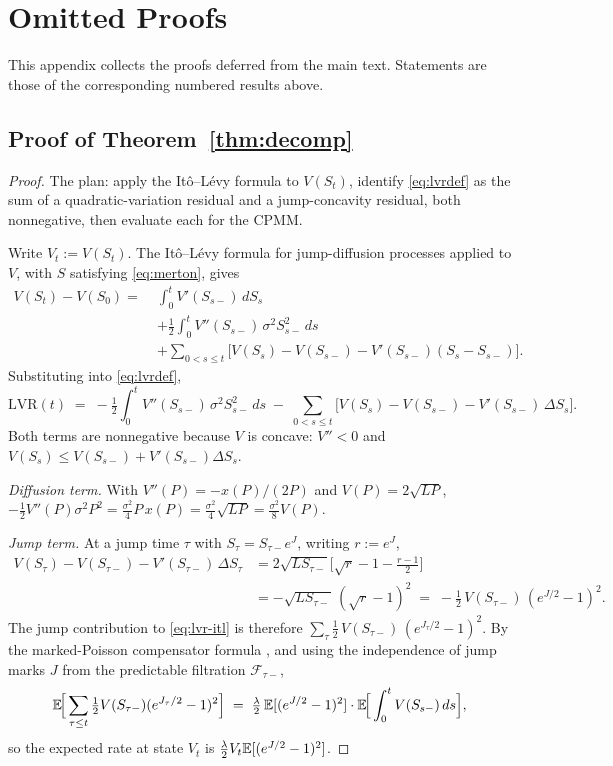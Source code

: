 \section{Omitted Proofs}\label{app:proofs}

This appendix collects the proofs deferred from the main text. Statements are
those of the corresponding numbered results above.

\subsection{Proof of Theorem~\ref{thm:decomp}}\label{app:decomp}

\begin{proof}
The plan: apply the It\^o--L\'evy formula to $V(S_t)$, identify \eqref{eq:lvrdef} as the sum of a quadratic-variation residual and a jump-concavity residual, both nonnegative, then evaluate each for the CPMM.

Write $V_t := V(S_t)$. The It\^o--L\'evy formula for jump-diffusion processes \cite[Prop.~8.14]{cont2003financial} applied to $V$, with $S$ satisfying \eqref{eq:merton}, gives
\begin{align*}
V(S_t) - V(S_0) =\;& \int_0^t V'(S_{s-})\,dS_s \\
&+ \tfrac{1}{2}\int_0^t V''(S_{s-})\,\sigma^2 S_{s-}^2 \,ds \\
&+ \sum_{0 < s \leq t} \!\Big[V(S_s) - V(S_{s-}) - V'(S_{s-})(S_s - S_{s-})\Big].
\end{align*}
Substituting into \eqref{eq:lvrdef},
\begin{equation}\label{eq:lvr-itl}
\mathrm{LVR}(t) \;=\; -\tfrac{1}{2}\int_0^t V''(S_{s-})\,\sigma^2 S_{s-}^2 \, ds \;-\; \sum_{0 < s \leq t}\!\Big[V(S_s) - V(S_{s-}) - V'(S_{s-})\,\Delta S_s\Big].
\end{equation}
Both terms are nonnegative because $V$ is concave: $V''<0$ and $V(S_s) \leq V(S_{s-}) + V'(S_{s-})\Delta S_s$.

\emph{Diffusion term.} With $V''(P) = -x(P)/(2P)$ and $V(P) = 2\sqrt{LP}$, $-\tfrac{1}{2} V''(P) \sigma^2 P^2 = \tfrac{\sigma^2}{4} P\,x(P) = \tfrac{\sigma^2}{4} \sqrt{L P} = \tfrac{\sigma^2}{8} V(P)$.

\emph{Jump term.} At a jump time $\tau$ with $S_\tau = S_{\tau-} e^{J}$, writing $r := e^J$,
\begin{align*}
V(S_\tau) - V(S_{\tau-}) - V'(S_{\tau-})\,\Delta S_\tau
&= 2\sqrt{L S_{\tau-}}\Big[\sqrt{r} - 1 - \tfrac{r-1}{2}\Big] \\
&= -\sqrt{L S_{\tau-}}\,(\sqrt{r}-1)^2 \;=\; -\tfrac{1}{2}\,V(S_{\tau-})\,(e^{J/2} - 1)^2.
\end{align*}
The jump contribution to \eqref{eq:lvr-itl} is therefore $\sum_{\tau} \tfrac{1}{2}\,V(S_{\tau-})\,(e^{J_\tau/2} - 1)^2$. By the marked-Poisson compensator formula \cite[Prop.~8.8]{cont2003financial}, and using the independence of jump marks $J$ from the predictable filtration $\mathcal{F}_{\tau-}$,
\[
\mathbb{E}\!\Big[\sum_{\tau \leq t} \tfrac{1}{2}V(S_{\tau-})(e^{J_\tau/2}-1)^2\Big] \;=\; \tfrac{\lambda}{2}\,\mathbb{E}[(e^{J/2}-1)^2]\cdot\mathbb{E}\!\Big[\int_0^t V(S_{s-})\,ds\Big],
\]
so the expected rate at state $V_t$ is $\tfrac{\lambda}{2} V_t \mathbb{E}[(e^{J/2}-1)^2]$.


\end{proof}
